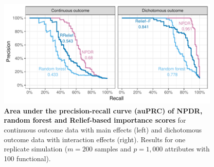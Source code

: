 \documentclass[10pt]{article}
\begin{document}
\begin{figure}[!tbp]
\centerline{\includegraphics[trim = 0 0 0 0]{../figs/fig2_pr_plots.pdf}}
\caption{{\bf Area under the precision-recall curve (auPRC) of NPDR, random forest and Relief-based importance scores} for continuous outcome data with main effects (left) and dichotomous outcome data with interaction effects (right). Results for one replicate simulation ($m = 200$ samples and $p = 1,000$ attributes with 100 functional).}
\label{fig:pr_curve}
\end{figure}
\end{document}
